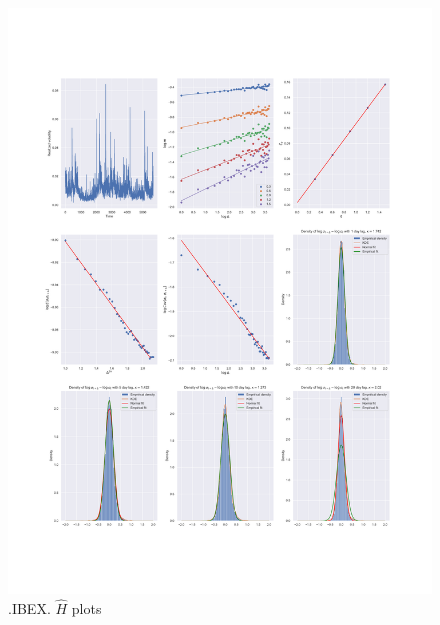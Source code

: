 	\begin{figure}[h]
		\centering
		\includegraphics[width=\linewidth]{fig/.IBEX.pdf}
		\caption{.IBEX. $\hat{H}$ plots}
	\end{figure}

